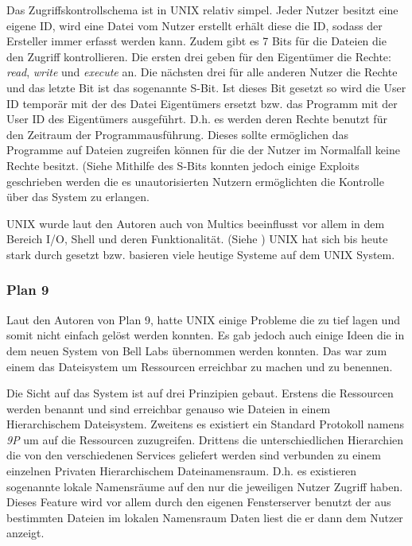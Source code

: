 \documentclass[german, 9pt,technote]{IEEEtran}
\begin{document}
		    Das Zugriffskontrollschema ist in UNIX relativ simpel. Jeder Nutzer besitzt eine eigene ID, wird eine Datei vom Nutzer erstellt  erh\"alt diese die ID, sodass der Ersteller immer
		    erfasst werden kann. Zudem gibt es 7 Bits f\"ur die Dateien die den Zugriff kontrollieren. 
		    Die ersten drei geben f\"ur den Eigent\"umer die Rechte: \textit{read}, \textit{write} und \textit{execute} an.
		    Die n\"achsten drei f\"ur alle anderen Nutzer die Rechte und das letzte Bit ist das sogenannte S-Bit. Ist dieses Bit gesetzt so wird die User ID tempor\"ar
		    mit der des Datei Eigent\"umers ersetzt bzw. das Programm mit der User ID des Eigent\"umers ausgef\"uhrt.
		    D.h. es werden deren Rechte benutzt f\"ur den Zeitraum der Programmausf\"uhrung. Dieses sollte erm\"oglichen das Programme
		    auf Dateien zugreifen k\"onnen f\"ur die der Nutzer im Normalfall keine Rechte besitzt. (Siehe \cite[S. 367]{inproc:unix}    
		    Mithilfe des S-Bits konnten jedoch einige Exploits geschrieben werden die es unautorisierten Nutzern erm\"oglichten
		    die Kontrolle \"uber das System zu erlangen. 
		    
		    UNIX wurde laut den Autoren auch von Multics beeinflusst vor allem in dem Bereich I/O, Shell und deren Funktionalit\"at. (Siehe \cite[S. 374]{inproc:unix})
		    UNIX hat sich bis heute stark durch gesetzt bzw. basieren viele heutige Systeme auf dem UNIX System.
	    \subsubsection{Plan 9} \label{sec:secure:access:plan9}
        Laut den Autoren von Plan 9, hatte UNIX einige Probleme die zu tief lagen und somit nicht einfach gel\"ost werden konnten.
        Es gab jedoch auch einige Ideen die in dem neuen System von Bell Labs \"ubernommen werden konnten.
        Das war zum einem das Dateisystem um Ressourcen erreichbar zu machen und zu benennen.
    
        Die Sicht auf das System ist auf drei Prinzipien gebaut.
        Erstens die Ressourcen werden benannt und sind erreichbar genauso wie Dateien in einem Hierarchischem Dateisystem. 
        Zweitens es existiert ein Standard Protokoll namens \textit{9P} um auf die 
        Ressourcen zuzugreifen. Drittens die unterschiedlichen Hierarchien die von den verschiedenen Services geliefert
        werden sind verbunden zu einem einzelnen Privaten Hierarchischem Dateinamensraum. 
        D.h. es existieren sogenannte lokale Namensr\"aume auf den nur die jeweiligen Nutzer Zugriff haben.
        Dieses Feature wird vor allem durch den eigenen Fensterserver benutzt der aus bestimmten Dateien im lokalen 
        Namensraum Daten liest die er dann dem Nutzer anzeigt.
        
\end{document}
